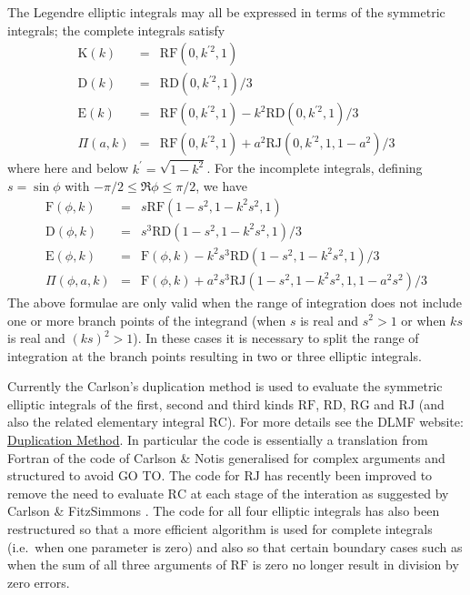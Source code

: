 The Legendre elliptic integrals may all be expressed in terms of the symmetric
integrals; the complete integrals satisfy
\begin{eqnarray*}
\mathrm{K}(k) &=& \mathrm{RF}(0,k^{\prime 2},1) \\
\mathrm{D}(k) &=& \mathrm{RD}(0,k^{\prime 2},1)/3 \\
\mathrm{E}(k) &=& \mathrm{RF}(0,k^{\prime 2},1)-k^2\mathrm{RD}(0,k^{\prime 2},1)/3\\
\Pi(a,k) &=&\mathrm{RF}(0,k^{\prime 2},1)+a^2\mathrm{RJ}(0,k^{\prime 2},1,1-a^2)/3
\end{eqnarray*}
where here and below $k^\prime=\sqrt{1-k^2}$. For the incomplete integrals,
defining $s=\sin \phi$ with $-\pi/2 \leq \Re{\phi} \leq \pi/2$, we have
\begin{eqnarray*}
\mathrm{F}(\phi,k) &=& s \mathrm{RF}(1-s^2, 1-k^2s^2, 1)\\
\mathrm{D}(\phi,k) &=& s^3 \mathrm{RD}(1-s^2, 1-k^2s^2, 1)/3\\
\mathrm{E}(\phi,k) &=&\mathrm{F}(\phi,k)-k^2s^3\mathrm{RD}(1-s^2,1-k^2s^2,1)/3\\
\Pi(\phi,a,k) &=&\mathrm{F}(\phi,k) +a^2s^3\mathrm{RJ}(1-s^2,1-k^2s^2,1,1-a^2s^2)/3
\end{eqnarray*}
The above formulae are only valid when the range of integration does not
include one or more branch points of the integrand (when $s$ is real and
$s^2>1$ or when $k s$ is real and $(k s)^2 >1$).  In these cases it is necessary
to split the range of integration at the branch points resulting in two or three
elliptic integrals.

Currently the Carlson's duplication method is used to evaluate the
symmetric elliptic integrals of the first, second and third kinds
$\mathrm{RF}$, $\mathrm{RD}$, $\mathrm{RG}$ and $\mathrm{RJ}$ (and also the
related elementary integral $\mathrm{RC}$).  For more details see the DLMF
website: \href{https://dlmf.nist.gov/19.36#i}{Duplication Method}.
In particular the \REDUCE code  is essentially a translation from
Fortran of the code of Carlson \& Notis \cite{CarlsonNotis:81} generalised
for complex arguments and structured to avoid GO TO. The code for $\mathrm{RJ}$
has recently been improved to remove the need to evaluate $\mathrm{RC}$ at each
stage of the interation as suggested by Carlson \& FitzSimmons
\cite{CarlsonFitzSimmons:00}. The code for all four elliptic integrals has also been
restructured so that a more efficient algorithm is used for complete integrals
(i.e.\ when one parameter is zero) and also so that certain boundary cases such as
when the sum of all three arguments of $\mathrm{RF}$ is zero no longer result in
division by zero errors.

